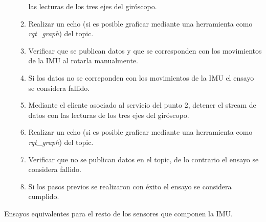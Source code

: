\documentclass[
11pt, %
codirector, %
]{simple_charter}
\begin{document}
\begin{itemize}
\begin{enumerate}
		las lecturas de los tres ejes del giróscopo.
		\item Realizar un echo (si es posible graficar mediante una herramienta como
		\textit{rqt\_graph}) del topic.
		\item Verificar que se publican datos y que se corresponden con los movimientos de la IMU
		al rotarla manualmente.
		\item Si los datos no se correponden con los movimientos de la IMU el ensayo se considera
		fallido.
		\item Mediante el cliente asociado al servicio del punto 2, detener el stream de datos con
		las lecturas de los tres ejes del giróscopo.
		\item Realizar un echo (si es posible graficar mediante una herramienta como
		\textit{rqt\_graph}) del topic.
		\item Verificar que no se publican datos en el topic, de lo contrario el ensayo se considera
		fallido.
		\item Si los pasos previos se realizaron con éxito el ensayo se considera cumplido.
	\end{enumerate}
\end{itemize}

Ensayos equivalentes para el resto de los sensores que componen la IMU.
\end{document}
